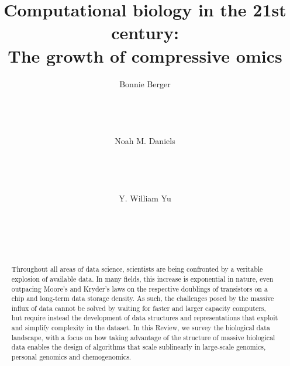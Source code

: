 \documentclass{acm_proc_article-sp}
\begin{document}
\title{Computational biology in the 21st century:\\The growth of compressive 
omics}

\author{
\alignauthor
Bonnie Berger\\
       \\
       \\
       \\
       \\
\alignauthor
Noah M. Daniels\\
       \\
       \\
       \\
       \\
\alignauthor
Y. William Yu\\
       \\
       \\
       \\
       \\
}

\maketitle
\begin{abstract}
Throughout all areas of data science, scientists are being confronted by a
veritable explosion of available data. In many fields, this increase is
exponential in nature, even outpacing Moore's and Kryder's laws on the
respective doublings of transistors on a chip and long-term data storage
density. As such, the challenges posed by the massive influx of data cannot
be solved by waiting for faster and larger capacity computers, but require
instead the development of data structures and representations that exploit
and simplify complexity in the dataset. In this Review, we
survey the biological data landscape, with a focus on how taking advantage
of the structure of massive biological data enables the design of algorithms
that scale sublinearly in large-scale genomics, personal genomics and
chemogenomics.
\end{abstract}
\end{document}

